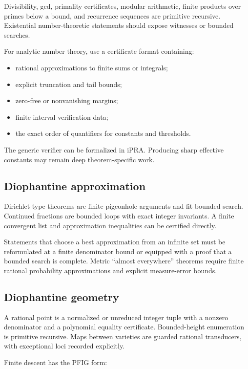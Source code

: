 Divisibility, gcd, primality certificates, modular arithmetic, finite products over primes below a bound, and recurrence sequences are primitive recursive.  Existential number-theoretic statements should expose witnesses or bounded searches.

For analytic number theory, use a certificate format containing:

\begin{itemize}
\item rational approximations to finite sums or integrals;
\item explicit truncation and tail bounds;
\item zero-free or nonvanishing margins;
\item finite interval verification data;
\item the exact order of quantifiers for constants and thresholds.
\end{itemize}

The generic verifier can be formalized in iPRA.  Producing sharp effective constants may remain deep theorem-specific work.

\subsection{Diophantine approximation}

Dirichlet-type theorems are finite pigeonhole arguments and fit bounded search.  Continued fractions are bounded loops with exact integer invariants.  A finite convergent list and approximation inequalities can be certified directly.

Statements that choose a best approximation from an infinite set must be reformulated at a finite denominator bound or equipped with a proof that a bounded search is complete.  Metric ``almost everywhere'' theorems require finite rational probability approximations and explicit measure-error bounds.

\subsection{Diophantine geometry}

A rational point is a normalized or unreduced integer tuple with a nonzero denominator and a polynomial equality certificate.  Bounded-height enumeration is primitive recursive.  Maps between varieties are guarded rational transducers, with exceptional loci recorded explicitly.

Finite descent has the PFIG form:

